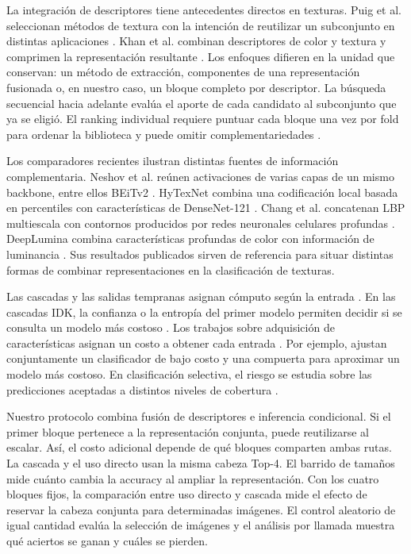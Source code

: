 \documentclass[a4paper,fleqn]{cas-sc}
\begin{document}
La integración de descriptores tiene antecedentes directos en texturas. Puig et al. seleccionan métodos de textura con la intención de reutilizar un subconjunto en distintas aplicaciones \citep{puig2010selection}. Khan et al. combinan descriptores de color y textura y comprimen la representación resultante \citep{khan2015compact}. Los enfoques difieren en la unidad que conservan: un método de extracción, componentes de una representación fusionada o, en nuestro caso, un bloque completo por descriptor. La búsqueda secuencial hacia adelante evalúa el aporte de cada candidato al subconjunto que ya se eligió. El ranking individual requiere puntuar cada bloque una vez por fold para ordenar la biblioteca y puede omitir complementariedades \citep{kohavi1997wrappers,guyon2003feature}.

Los comparadores recientes ilustran distintas fuentes de información complementaria. Neshov et al. reúnen activaciones de varias capas de un mismo backbone, entre ellos BEiTv2 \citep{neshov2025aggregation}. HyTexNet combina una codificación local basada en percentiles con características de DenseNet-121 \citep{gupta2026hytexnet}. Chang et al. concatenan LBP multiescala con contornos producidos por redes neuronales celulares profundas \citep{chang2024cellnn}. DeepLumina combina características profundas de color con información de luminancia \citep{simon2022deeplumina}. Sus resultados publicados sirven de referencia para situar distintas formas de combinar representaciones en la clasificación de texturas.

Las cascadas y las salidas tempranas asignan cómputo según la entrada \citep{viola2001rapid,teerapittayanon2016branchynet,han2021dynamic}. En las cascadas IDK, la confianza o la entropía del primer modelo permiten decidir si se consulta un modelo más costoso \citep{wang2018idk}. Los trabajos sobre adquisición de características asignan un costo a obtener cada entrada \citep{xu2012greedy,ma2019eddi}. Por ejemplo, \citet{nan2017adaptive} ajustan conjuntamente un clasificador de bajo costo y una compuerta para aproximar un modelo más costoso. En clasificación selectiva, el riesgo se estudia sobre las predicciones aceptadas a distintos niveles de cobertura \citep{geifman2017selective}.

Nuestro protocolo combina fusión de descriptores e inferencia condicional. Si el primer bloque pertenece a la representación conjunta, puede reutilizarse al escalar. Así, el costo adicional depende de qué bloques comparten ambas rutas. La cascada y el uso directo usan la misma cabeza Top-4. El barrido de tamaños mide cuánto cambia la accuracy al ampliar la representación. Con los cuatro bloques fijos, la comparación entre uso directo y cascada mide el efecto de reservar la cabeza conjunta para determinadas imágenes. El control aleatorio de igual cantidad evalúa la selección de imágenes y el análisis por llamada muestra qué aciertos se ganan y cuáles se pierden.
\end{document}
